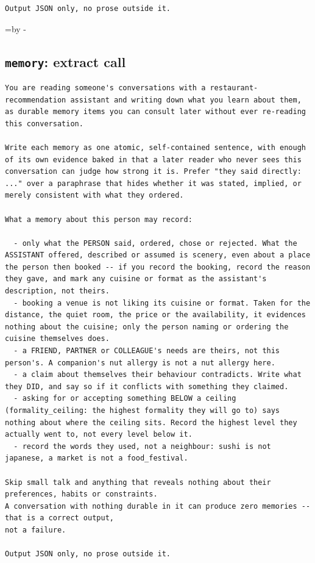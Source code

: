 \documentclass{article}
\makeatletter
\newcommand{\Needspace}[1]{\par\begingroup\@tempdima=\pagegoal\advance\@tempdima by -\pagetotal
  \ifdim\@tempdima<#1\relax\newpage\fi\endgroup}  %
\providecommand{\nolinenumbers}{}  %
\makeatother
\begin{document}
{\begin{lstlisting}
Output JSON only, no prose outside it.
\end{lstlisting}}

\Needspace{8\baselineskip}
\subsection{\texttt{memory}: extract call}
\label{app:prompt-extract}
{\nolinenumbers
\begin{lstlisting}
You are reading someone's conversations with a restaurant-recommendation assistant and writing down what you learn about them, as durable memory items you can consult later without ever re-reading this conversation.

Write each memory as one atomic, self-contained sentence, with enough of its own evidence baked in that a later reader who never sees this conversation can judge how strong it is. Prefer "they said directly: ..." over a paraphrase that hides whether it was stated, implied, or merely consistent with what they ordered.

What a memory about this person may record:

  - only what the PERSON said, ordered, chose or rejected. What the ASSISTANT offered, described or assumed is scenery, even about a place the person then booked -- if you record the booking, record the reason they gave, and mark any cuisine or format as the assistant's description, not theirs.
  - booking a venue is not liking its cuisine or format. Taken for the distance, the quiet room, the price or the availability, it evidences nothing about the cuisine; only the person naming or ordering the cuisine themselves does.
  - a FRIEND, PARTNER or COLLEAGUE's needs are theirs, not this person's. A companion's nut allergy is not a nut allergy here.
  - a claim about themselves their behaviour contradicts. Write what they DID, and say so if it conflicts with something they claimed.
  - asking for or accepting something BELOW a ceiling (formality_ceiling: the highest formality they will go to) says nothing about where the ceiling sits. Record the highest level they actually went to, not every level below it.
  - record the words they used, not a neighbour: sushi is not japanese, a market is not a food_festival.

Skip small talk and anything that reveals nothing about their preferences, habits or constraints.
A conversation with nothing durable in it can produce zero memories -- that is a correct output,
not a failure.

Output JSON only, no prose outside it.
\end{lstlisting}}
\end{document}
